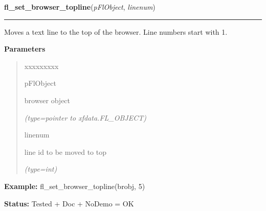 \hspace{.8\funcindent}\begin{boxedminipage}{\funcwidth}

    \raggedright \textbf{fl\_set\_browser\_topline}(\textit{pFlObject}, \textit{linenum})

    \vspace{-1.5ex}

    \rule{\textwidth}{0.5\fboxrule}
\setlength{\parskip}{2ex}
    Moves a text line to the top of the browser. Line numbers start with 1.

\setlength{\parskip}{1ex}
      \textbf{Parameters}
      \vspace{-1ex}

      \begin{quote}
        \begin{Ventry}{xxxxxxxxx}

          \item[pFlObject]

          browser object

            {\it (type=pointer to xfdata.FL\_OBJECT)}

          \item[linenum]

          line id to be moved to top

            {\it (type=int)}

        \end{Ventry}

      \end{quote}

\textbf{Example:} fl\_set\_browser\_topline(brobj, 5)



\textbf{Status:} Tested + Doc + NoDemo = OK



    \end{boxedminipage}

    \label{xformslib:flbrowser:fl_set_browser_bottomline}

    \vspace{0.5ex}

